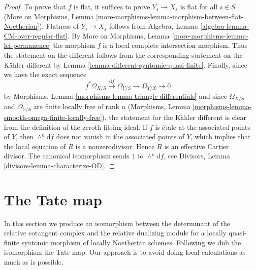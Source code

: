 \documentclass{stacks-project}
\theoremstyle{plain}
\theoremstyle{definition}
\theoremstyle{remark}
\numberwithin{equation}{subsection}
\begin{document}
\begin{proof}
To prove that $f$ is flat, it suffices to prove $Y_s \to X_s$
is flat for all $s \in S$ (More on Morphisms, Lemma
\ref{more-morphisms-lemma-morphism-between-flat-Noetherian}).
Flatness of $Y_s \to X_s$ follows from
Algebra, Lemma \ref{algebra-lemma-CM-over-regular-flat}.
By More on Morphisms, Lemma
\ref{more-morphisms-lemma-lci-permanence}
the morphism $f$ is a local complete intersection morphism.
Thus the statement on the different follows from the
corresponding statement on the K\"ahler different by
Lemma \ref{lemma-different-syntomic-quasi-finite}.
Finally, since we have the exact sequence
$$
f^*\Omega_{X/S} \xrightarrow{\text{d}f} \Omega_{Y/S} \to \Omega_{Y/X} \to 0
$$
by Morphisms, Lemma \ref{morphisms-lemma-triangle-differentials}
and since $\Omega_{X/S}$ and $\Omega_{Y/S}$ are finite locally free
of rank $n$ (Morphisms, Lemma
\ref{morphisms-lemma-smooth-omega-finite-locally-free}),
the statement for the K\"ahler different is clear from the definition
of the zeroth fitting ideal. If $f$ is \'etale at the associated
points of $Y$, then $\wedge^n\text{d}f$ does not vanish in
the associated points of $Y$, which implies that the local equation
of $R$ is a nonzerodivisor. Hence $R$ is an effective Cartier divisor.
The canonical isomorphism sends $1$ to $\wedge^n\text{d}f$, see
Divisors, Lemma \ref{divisors-lemma-characterize-OD}.
\end{proof}






\section{The Tate map}
\label{section-tate-map}

\noindent
In this section we produce an isomorphism between
the determinant of the relative cotangent complex and
the relative dualizing module for a locally quasi-finite
syntomic morphism of locally Noetherian schemes. Following
\cite[1.4.4]{Garel} we dub the isomorphism the Tate map.
Our approach is to avoid doing local calculations as
much as is possible.
\end{document}

